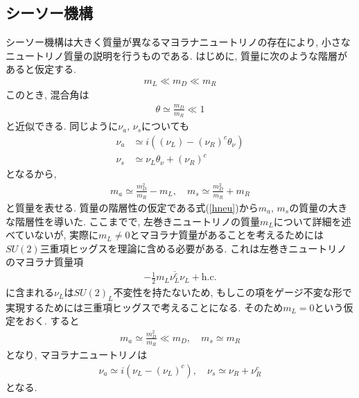 \subsection{シーソー機構}
シーソー機構は大きく質量が異なるマヨラナニュートリノの存在により, 小さなニュートリノ質量の説明を行うものである.
はじめに, 質量に次のような階層があると仮定する.
\begin{align}
  m_L \ll m_D \ll m_R \label{hneu}
\end{align}
このとき, 混合角は
\begin{align}
  \theta \simeq \frac{m_D}{m_R} \ll 1
\end{align}
と近似できる.
同じように$\nu_a,\,\nu_s$についても
\begin{align}
  \nu_a &\simeq i\left((\nu_L)-(\nu_R)^c\theta_\nu \right)\nonumber\\
  \nu_s &\simeq \nu_L\theta_\nu + (\nu_R)^c\nonumber
\end{align}
となるから,
\begin{align}
  m_a \simeq \frac{m_D^2}{m_R} - m_L,\quad m_s \simeq \frac{m_D^2}{m_R} + m_R\nonumber
\end{align}
と質量を表せる.
質量の階層性の仮定である式(\ref{hneu})から$m_a,\,m_s$の質量の大きな階層性を導いた.
ここまでで, 左巻きニュートリノの質量$m_L$について詳細を述べていないが, 実際に$m_L\neq0$とマヨラナ質量があることを考えるためには$SU(2)$三重項ヒッグスを理論に含める必要がある.
これは左巻きニュートリノのマヨラナ質量項
\begin{align}
  -\frac{1}{2}m_L\overline{\nu_L^c}\nu_L + \mathrm{h.c.} \nonumber
\end{align}
に含まれる$\nu_L$は$SU(2)_L$不変性を持たないため, もしこの項をゲージ不変な形で実現するためには三重項ヒッグスで考えることになる.
そのため$m_L =0$という仮定をおく.
すると
\begin{align}
  m_a \simeq \frac{m_D^2}{m_R}\ll m_D,\quad m_s \simeq m_R\nonumber
\end{align}
となり, マヨラナニュートリノは
\begin{align}
  \nu_a \simeq i\left(\nu_L - (\nu_L)^c\right),\quad \nu_s \simeq \nu_R + \nu_R^c
\end{align}
となる.


